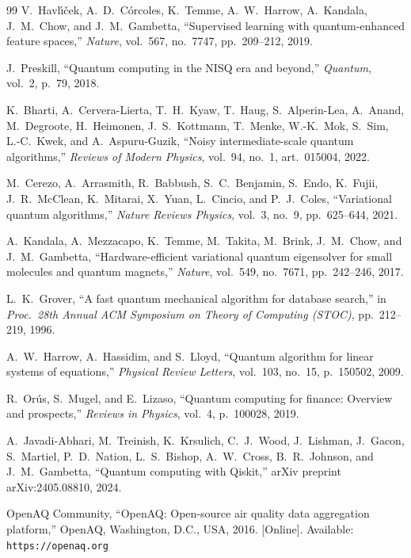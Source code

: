 \documentclass[conference]{IEEEtran}
\begin{document}
\begin{thebibliography}{99}
V.~Havl\'{\i}\v{c}ek, A.~D.~C\'{o}rcoles, K.~Temme,
A.~W.~Harrow, A.~Kandala, J.~M.~Chow, and J.~M.~Gambetta,
``Supervised learning with quantum-enhanced feature spaces,''
\emph{Nature}, vol.~567, no.~7747, pp.~209--212, 2019.

J.~Preskill,
``Quantum computing in the NISQ era and beyond,''
\emph{Quantum}, vol.~2, p.~79, 2018.

K.~Bharti, A.~Cervera-Lierta, T.~H.~Kyaw, T.~Haug, S.~Alperin-Lea,
A.~Anand, M.~Degroote, H.~Heimonen, J.~S.~Kottmann, T.~Menke,
W.-K.~Mok, S.~Sim, L.-C.~Kwek, and A.~Aspuru-Guzik,
``Noisy intermediate-scale quantum algorithms,''
\emph{Reviews of Modern Physics}, vol.~94, no.~1, art.~015004, 2022.

M.~Cerezo, A.~Arrasmith, R.~Babbush, S.~C.~Benjamin, S.~Endo,
K.~Fujii, J.~R.~McClean, K.~Mitarai, X.~Yuan, L.~Cincio,
and P.~J.~Coles,
``Variational quantum algorithms,''
\emph{Nature Reviews Physics}, vol.~3, no.~9, pp.~625--644, 2021.

A.~Kandala, A.~Mezzacapo, K.~Temme, M.~Takita, M.~Brink,
J.~M.~Chow, and J.~M.~Gambetta,
``Hardware-efficient variational quantum eigensolver for small molecules
and quantum magnets,''
\emph{Nature}, vol.~549, no.~7671, pp.~242--246, 2017.

L.~K.~Grover,
``A fast quantum mechanical algorithm for database search,''
in \emph{Proc.~28th Annual ACM Symposium on Theory of Computing
(STOC)}, pp.~212--219, 1996.

A.~W.~Harrow, A.~Hassidim, and S.~Lloyd,
``Quantum algorithm for linear systems of equations,''
\emph{Physical Review Letters}, vol.~103, no.~15, p.~150502, 2009.

R.~Or\'{u}s, S.~Mugel, and E.~Lizaso,
``Quantum computing for finance: Overview and prospects,''
\emph{Reviews in Physics}, vol.~4, p.~100028, 2019.

A.~Javadi-Abhari, M.~Treinish, K.~Krsulich, C.~J.~Wood,
J.~Lishman, J.~Gacon, S.~Martiel, P.~D.~Nation, L.~S.~Bishop,
A.~W.~Cross, B.~R.~Johnson, and J.~M.~Gambetta,
``Quantum computing with Qiskit,''
arXiv preprint arXiv:2405.08810, 2024.

OpenAQ Community,
``OpenAQ: Open-source air quality data aggregation platform,''
OpenAQ, Washington, D.C., USA, 2016.
[Online]. Available: \texttt{https://openaq.org}


\end{thebibliography}
\end{document}
